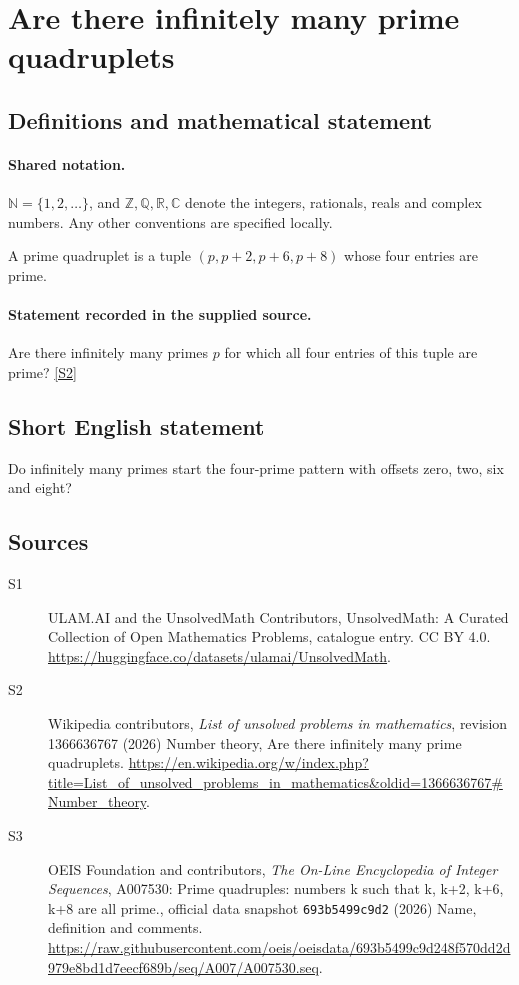 \documentclass[11pt]{article}
\newcommand{\sref}[2]{\hyperlink{source:#1:#2}{[S#2]}}
\begin{document}
\section{Are there infinitely many prime quadruplets}\label{statement}

\subsection{Definitions and mathematical statement}

\paragraph{Shared notation.}$\mathbb N=\{1,2,\ldots\}$, and $\mathbb Z,\mathbb Q,\mathbb R,\mathbb C$ denote the integers, rationals, reals and complex numbers. Any other conventions are specified locally.


A prime quadruplet is a tuple $(p,p+2,p+6,p+8)$ whose four entries are prime.
\paragraph{Statement recorded in the supplied source.}
Are there infinitely many primes $p$ for which all four entries of this tuple are prime? \sref{statement}{2}
\subsection{Short English statement}
Do infinitely many primes start the four-prime pattern with offsets zero, two, six and eight?
\subsection{Sources}
\begin{description}
\item[\hypertarget{source:statement:1}{S1}] ULAM.AI and the UnsolvedMath Contributors, UnsolvedMath: A Curated Collection of Open Mathematics Problems, catalogue entry. CC BY 4.0. \url{https://huggingface.co/datasets/ulamai/UnsolvedMath}.
\item[\hypertarget{source:statement:2}{S2}] Wikipedia contributors, \emph{List of unsolved problems in mathematics}, revision 1366636767 (2026) Number theory, Are there infinitely many prime quadruplets. \url{https://en.wikipedia.org/w/index.php?title=List_of_unsolved_problems_in_mathematics&oldid=1366636767#Number_theory}.
\item[\hypertarget{source:statement:3}{S3}] OEIS Foundation and contributors, \emph{The On-Line Encyclopedia of Integer Sequences}, A007530: Prime quadruples: numbers k such that k, k+2, k+6, k+8 are all prime., official data snapshot \texttt{693b5499c9d2} (2026) Name, definition and comments. \url{https://raw.githubusercontent.com/oeis/oeisdata/693b5499c9d248f570dd2d979e8bd1d7eecf689b/seq/A007/A007530.seq}.
\end{description}
\label{end:statement}
\end{document}
